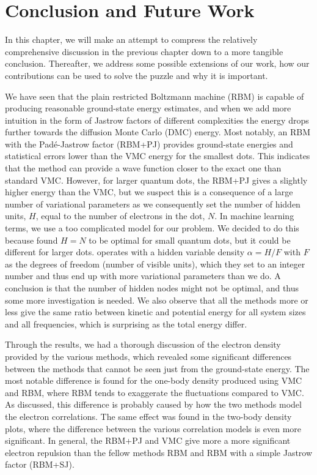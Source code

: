 \chapter{Conclusion and Future Work} \label{sec:conclusion}
In this chapter, we will make an attempt to compress the relatively comprehensive discussion in the previous chapter down to a more tangible conclusion. Thereafter, we address some possible extensions of our work, how our contributions can be used to solve the puzzle and why it is important. 

We have seen that the plain restricted Boltzmann machine (RBM) is capable of producing reasonable ground-state energy estimates, and when we add more intuition in the form of Jastrow factors of different complexities the energy drops further towards the diffusion Monte Carlo (DMC) energy. Most notably, an RBM with the Padé-Jastrow  factor (RBM+PJ) provides ground-state energies and statistical errors lower than the VMC energy for the smallest dots. This indicates that the method can provide a wave function closer to the exact one than standard VMC. However, for larger quantum dots, the RBM+PJ gives a slightly higher energy than the VMC, but we suspect this is a consequence of a large number of variational parameters as we consequently set the number of hidden units, $H$, equal to the number of electrons in the dot, $N$. In machine learning terms, we use a too complicated model for our problem. We decided to do this because \citet{nordhagen_computational_2018} found $H=N$ to be optimal for small quantum dots, but it could be different for larger dots. \citet{carleo_solving_2017} operates with a hidden variable density $\alpha=H/F$ with $F$ as the degrees of freedom (number of visible units), which they set to an integer number and thus end up with more variational parameters than we do. A conclusion is that the number of hidden nodes might not be optimal, and thus some more investigation is needed. We also observe that all the methods more or less give the same ratio between kinetic and potential energy for all system sizes and all frequencies, which is surprising as the total energy differ.

Through the results, we had a thorough discussion of the electron density provided by the various methods, which revealed some significant differences between the methods that cannot be seen just from the ground-state energy. The most notable difference is found for the one-body density produced using VMC and RBM, where RBM tends to exaggerate the fluctuations compared to VMC. As discussed, this difference is probably caused by how the two methods model the electron correlations. The same effect was found in the two-body density plots, where the difference between the various correlation models is even more significant. In general, the RBM+PJ and VMC give more a more significant electron repulsion than the fellow methods RBM and RBM with a simple Jastrow factor (RBM+SJ).

